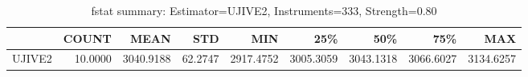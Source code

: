 \begin{table}[ht]
\centering
\caption{fstat summary: Estimator=UJIVE2, Instruments=333, Strength=0.80}
\begin{tabular}{lrrrrrrrr}
\toprule
 & COUNT & MEAN & STD & MIN & 25\% & 50\% & 75\% & MAX \\
\midrule
UJIVE2 & 10.0000 & 3040.9188 & 62.2747 & 2917.4752 & 3005.3059 & 3043.1318 & 3066.6027 & 3134.6257 \\
\bottomrule
\end{tabular}
\end{table}
